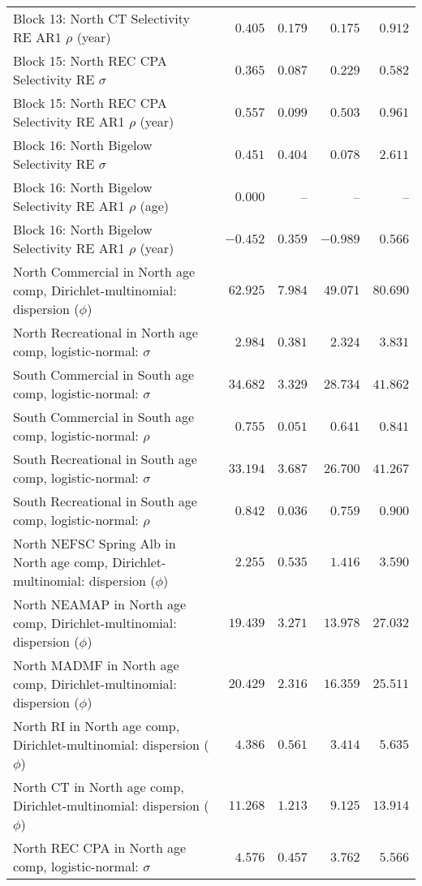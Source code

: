 \documentclass[
]{article}
\begin{document}
\begin{landscape}
\begin{longtable}[t]{lrrrr}
Block 13: North CT Selectivity RE AR1 $\rho$ (year) & $0.405$ & $0.179$ & $0.175$ & $0.912$\\
\addlinespace
Block 15: North REC CPA Selectivity RE $\sigma$ & $0.365$ & $0.087$ & $0.229$ & $0.582$\\
Block 15: North REC CPA Selectivity RE AR1 $\rho$ (year) & $0.557$ & $0.099$ & $0.503$ & $0.961$\\
Block 16: North Bigelow Selectivity RE $\sigma$ & $0.451$ & $0.404$ & $0.078$ & $2.611$\\
Block 16: North Bigelow Selectivity RE AR1 $\rho$ (age) & $0.000$ & -- & -- & --\\
Block 16: North Bigelow Selectivity RE AR1 $\rho$ (year) & $-0.452$ & $0.359$ & $-0.989$ & $0.566$\\
\addlinespace
North Commercial in North age comp, Dirichlet-multinomial: dispersion ($\phi$) & $62.925$ & $7.984$ & $49.071$ & $80.690$\\
North Recreational in North age comp, logistic-normal: $\sigma$ & $2.984$ & $0.381$ & $2.324$ & $3.831$\\
South Commercial in South age comp, logistic-normal: $\sigma$ & $34.682$ & $3.329$ & $28.734$ & $41.862$\\
South Commercial in South age comp, logistic-normal: $\rho$ & $0.755$ & $0.051$ & $0.641$ & $0.841$\\
South Recreational in South age comp, logistic-normal: $\sigma$ & $33.194$ & $3.687$ & $26.700$ & $41.267$\\
\addlinespace
South Recreational in South age comp, logistic-normal: $\rho$ & $0.842$ & $0.036$ & $0.759$ & $0.900$\\
North NEFSC Spring Alb in North age comp, Dirichlet-multinomial: dispersion ($\phi$) & $2.255$ & $0.535$ & $1.416$ & $3.590$\\
North NEAMAP in North age comp, Dirichlet-multinomial: dispersion ($\phi$) & $19.439$ & $3.271$ & $13.978$ & $27.032$\\
North MADMF in North age comp, Dirichlet-multinomial: dispersion ($\phi$) & $20.429$ & $2.316$ & $16.359$ & $25.511$\\
North RI in North age comp, Dirichlet-multinomial: dispersion ($\phi$) & $4.386$ & $0.561$ & $3.414$ & $5.635$\\
\addlinespace
North CT in North age comp, Dirichlet-multinomial: dispersion ($\phi$) & $11.268$ & $1.213$ & $9.125$ & $13.914$\\
North REC CPA in North age comp, logistic-normal: $\sigma$ & $4.576$ & $0.457$ & $3.762$ & $5.566$\\

\end{longtable}
\end{landscape}
\end{document}
